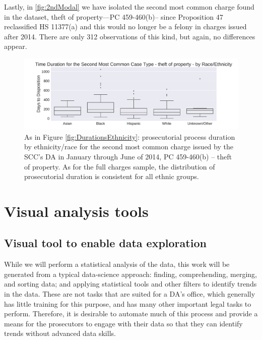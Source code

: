 \documentclass{AISB2008}
\begin{document}
Lastly, in \autoref{fig:2ndModal} we have isolated the second most
common charge found in the dataset, theft of property---PC 459-460(b)--
since Proposition 47 reclassified HS 11377(a) and this would no longer
be a felony in charges issued after 2014. There are only 312
observations of this kind, but again, no differences appear.


\begin{figure}[h!]
\begin{center}
\includegraphics[width=0.70\columnwidth]{figures/boxplot_race_2ndmodalcrime/boxplot_race_2ndmodalcrime}
\caption{As in Figure \ref{fig:DurationsEthnicity}: prosecutorial process duration by ethnicity/race for the second most common charge issued by the SCC's DA in January through June of 2014, PC 459-460(b) -- theft of property. As for the full charges sample, the distribution of prosecutorial duration is consistent for all ethnic groups.
\label{fig:2ndModal}%
}
\end{center}
\end{figure}

\section{Visual analysis tools}\label{visual-analysis-tools}

\subsection{Visual tool to enable data exploration}

While we will perform a statistical analysis of the data, this work
will be generated from a typical data-science approach: finding,
comprehending, merging, and sorting data; and applying statistical
tools and other filters to identify trends in the data. These are not
tasks that are suited for a DA's office, which generally has little
training for this purpose, and has many other important legal tasks to
perform. Therefore, it is desirable to automate much of this process
and provide a means for the prosecutors to engage with their data so
that they can identify trends without advanced data skills.
\end{document}
